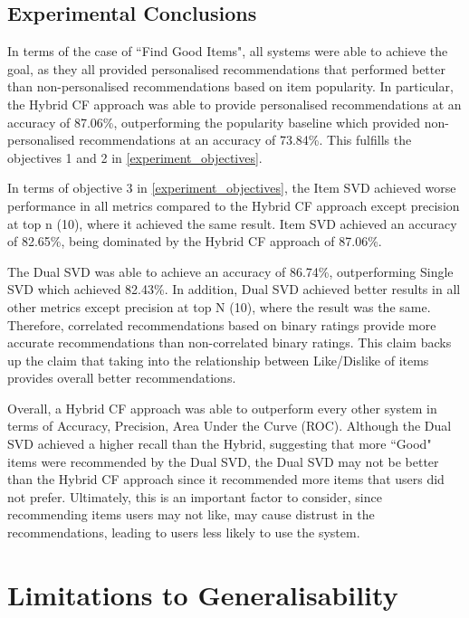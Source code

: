 \subsection{Experimental Conclusions}

In terms of the case of ``Find Good Items", all systems were able to achieve the goal, as they all provided personalised recommendations that performed better than non-personalised recommendations based on item popularity. In particular, the Hybrid CF approach was able to provide personalised recommendations at an accuracy of 87.06\%, outperforming the popularity baseline which provided non-personalised recommendations at an accuracy of 73.84\%. This fulfills the objectives 1 and 2 in \ref{experiment_objectives}. 

In terms of objective 3 in \ref{experiment_objectives}, the Item SVD achieved worse performance in all metrics compared to the Hybrid CF approach except precision at top n (10), where it achieved the same result. Item SVD achieved an accuracy of 82.65\%, being dominated by the Hybrid CF approach of 87.06\%. 

The Dual SVD was able to achieve an accuracy of 86.74\%, outperforming Single SVD which achieved 82.43\%. In addition, Dual SVD achieved better results in all other metrics except precision at top N (10), where the result was the same. Therefore, correlated recommendations based on binary ratings provide more accurate recommendations than non-correlated binary ratings. This claim backs up the claim that taking into the relationship between Like/Dislike of items provides overall better recommendations. 

Overall, a Hybrid CF approach was able to outperform every other system in terms of Accuracy, Precision, Area Under the Curve (ROC). Although the Dual SVD achieved a higher recall than the Hybrid, suggesting that more ``Good" items were recommended by the Dual SVD, the Dual SVD may not be better than the Hybrid CF approach since it recommended more items that users did not prefer. Ultimately, this is an important factor to consider, since recommending items users may not like, may cause distrust in the recommendations, leading to users less likely to use the system. 

\section{Limitations to Generalisability}

